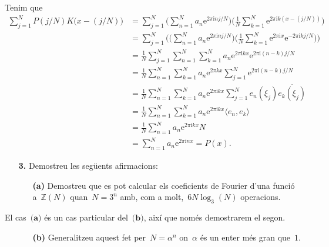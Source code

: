 \documentclass[a4paper]{article}
\theoremstyle{plain}
\theoremstyle{definition}
\newcommand{\iu}{\mathrm{i}}
\newcommand{\e}{\mathrm{e}}
\providecommand{\uppi}{\pi}
\newcommand{\conjugat}[1]{\overline{#1}}
\newcommand{\ZZ}{\mathbb{Z}}
\begin{document}
Tenim que
\begin{align*}
    \sum_{j=1}^{N}
    P(j/N)
    K\bigl(x-(j/N)\bigr)
    &=
    \sum_{j=1}^{N}
    \Biggl(
        \sum_{n=1}^{N}
        a_{n}\e^{2\uppi\iu nj/N}
    \Biggr)
    \Biggl(
        \frac{1}{N}
        \sum_{k=1}^{N}
        \e^{2\uppi\iu k(x-(j/N))}
    \Biggr) \\
    &=
    \sum_{j=1}^{N}
    \Biggl(
        \Biggl(
            \sum_{n=1}^{N}
            a_{n}
            \e^{2\uppi\iu nj/N}
        \Biggr)
        \Biggl(
            \frac{1}{N}
            \sum_{k=1}^{N}
            \e^{2\uppi\iu x}\e^{-2\uppi\iu kj/N}
        \Biggr)
    \Biggr) \\
    &=
    \frac{1}{N}
    \sum_{j=1}^{N}
    \sum_{n=1}^{N}
    \sum_{k=1}^{N}
    a_{n}
    \e^{2\uppi\iu kx}
    \e^{2\uppi\iu(n-k)j/N} \\
    &=
    \frac{1}{N}
    \sum_{n=1}^{N}
    \sum_{k=1}^{N}
    a_{n}\e^{2\uppi kx}
    \sum_{j=1}^{N}
    \e^{2\uppi\iu(n-k)j/N} \\
    &=
    \frac{1}{N}
    \sum_{n=1}^{N}
    \sum_{k=1}^{N}
    a_{n}
    \e^{2\uppi\iu kx}
    \sum_{j=1}^{N}
    e_{n}(\xi_{j})
    \conjugat{e_{k}(\xi_{j})} \\
    &=
    \frac{1}{N}
    \sum_{n=1}^{N}
    \sum_{k=1}^{N}
    a_{n}
    \e^{2\uppi\iu kx}
    \langle e_{n},e_{k}\rangle \\
    &=
    \frac{1}{N}
    \sum_{n=1}^{N}
    a_{n}
    \e^{2\uppi\iu kx}
    N \\
    &=
    \sum_{n=1}^{N}
    a_{n}
    \e^{2\uppi\iu nx}
    = P(x).
\end{align*}

\clearpage

\begin{enumerate}
    \item[\textbf{3.}] Demostreu les següents afirmacions:
        \begin{enumerate}
            \item[\textbf{(a)}] Demostreu que es pot calcular els coeficients de
                Fourier d'una funció a~\(\ZZ(N)\) quan~\(N=3^{n}\) amb, com a
                molt,~\(6N\log_{3}(N)\) operacions.
        \end{enumerate}
\end{enumerate}

El cas~\(\textbf{(a)}\) és un cas particular del~\(\textbf{(b)}\),
així que només demostrarem el segon.

\begin{enumerate}
    \item[]\begin{enumerate}
        \item[\textbf{(b)}] Generalitzeu aquest fet per~\(N=\alpha^{n}\)
            on~\(\alpha\) és un enter més gran que~\(1\).
    \end{enumerate}
\end{enumerate}
\end{document}
